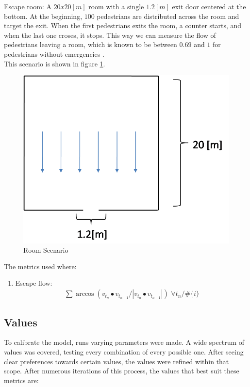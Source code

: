 \documentclass[english]{article}
\begin{document}
Escape room: A $20x20[m]$ room with a single $1.2[m]$ exit door
centered at the bottom. At the beginning, $100$ pedestrians are distributed
across the room and target the exit. When the first pedestrians exits
the room, a counter starts, and when the last one croses, it stops.
This way we can measure the flow of pedestrians leaving a room, which
is known to be between $0.69$ and $1$ for pedestrians without emergencies
\cite{key-pedEvDyn2012}. \\
 This scenario is shown in figure \ref{fig:room}.

\begin{figure}[h]
    \centering{}
    \includegraphics[scale=0.3]{pics/scenarios/room}
    \caption{\label{fig:room}Room Scenario}
\end{figure}

The metrics used where: 
\begin{enumerate}
    \item Escape flow: 
    \begin{eqnarray*}
    \sum\arccos(v_{t_{n}}\bullet v_{t_{n-1}}/|v_{t_{n}}\bullet v_{t_{n-1}}|)\,\,\forall t_{n}/\#\{i\}
\end{eqnarray*}

\end{enumerate}

\subsection{Values}

To calibrate the model, runs varying parameters were made. A wide
spectrum of values was covered, testing every combination of every
possible one. After seeing clear preferences towards certain values,
the values were refined within that scope. After numerous iterations
of this process, the values that best suit these metrics are:
\end{document}
